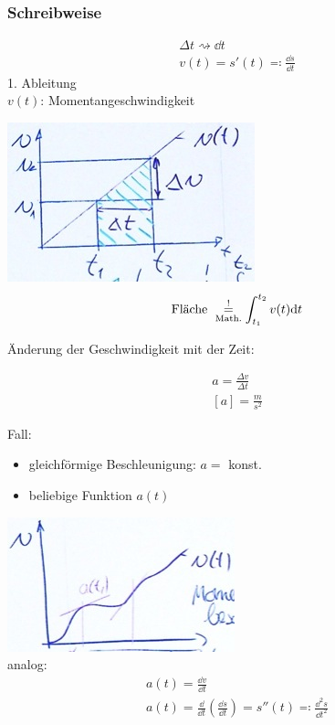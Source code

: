 \subsubsection{Schreibweise}
\begin{gather*}
	\Delta t \rightsquigarrow \dd t \\
	v(t) = s'(t) \eqqcolon \frac{\dd s}{\dd t}
\end{gather*}
1. Ableitung \\
$v(t)$: Momentangeschwindigkeit
\begin{bsp*}[ note = $v$ nimmt gleichmässig zu ]
	\includegraphics{Bild5}
	\[ \text{Fläche } \underset{\text{\scriptsize{Math.}}}{\overset{!}{=}} \int_{t_1}^{t_2} v(t) \dd t \]
\end{bsp*}
Änderung der Geschwindigkeit mit der Zeit:
\begin{def*}[ note = Beschleunigung , index = Beschleunigung ]
	\begin{gather*}
		a = \frac{\Delta v}{\Delta t} \\
		[a] = \frac{m}{s^2}
	\end{gather*}
\end{def*}
Fall:
\begin{itemize}
	\item gleichförmige Beschleunigung: $a =$ konst.
	\item beliebige Funktion $a(t)$
\end{itemize}
\includegraphics{Bild6} \\
analog:
\begin{gather*}
	a(t) = \frac{\dd v}{\dd t} \\
	a(t) = \frac{\dd}{\dd t} \left( \frac{\dd s}{\dd t} \right) = s''(t) \eqqcolon \frac{\dd^2 s}{\dd t^2}
\end{gather*}

